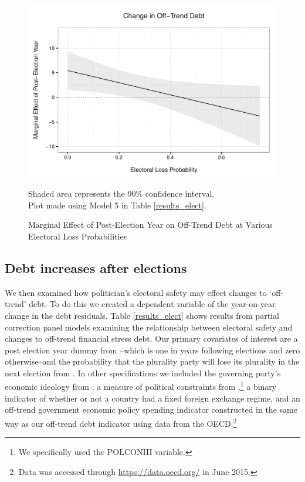 \documentclass[]{article}
\begin{document}
\begin{figure}
    \caption{Marginal Effect of Post-Election Year on Off-Trend Debt at Various Electoral Loss Probabilities}
    \label{post_loss_me}

    \begin{center}
        \includegraphics[scale=0.55]{analysis/figures/post_elect_loss.pdf}
    \end{center}

    {\scriptsize{Shaded area represents the 90\% confidence interval. \\
    Plot made using Model 5 in Table \ref{results_elect}.}}

\end{figure}

\subsection{Debt increases after elections}

We then examined how politician's electoral safety may effect changes to `off-trend' debt. To do this we created a dependent variable of the year-on-year change in the debt residuals. Table \ref{results_elect} shows results from partial correction panel models examining the relationship between electoral safety and changes to off-trend financial stress debt. Our primary covariates of interest are a post election year dummy from \cite{gandrudYrcurnt}--which is one in years following elections and zero otherwise--and the probability that the plurality party will lose its plurality in the next election from \cite{Kayser2015comp}. In other specifications we included the governing party's economic ideology from \citep[][updated through 2012]{DPI2001}, a measure of political constraints from \cite[][updated through 2011]{Henisz2004},\footnote{We specifically used the POLCONIII variable.} a binary indicator of whether or not a country had a fixed foreign exchange regime, and an off-trend government economic policy spending indicator constructed in the same way as our off-trend debt indicator using data from the OECD.\footnote{Data was accessed through \url{https://data.oecd.org/} in June 2015.}
\end{document}
